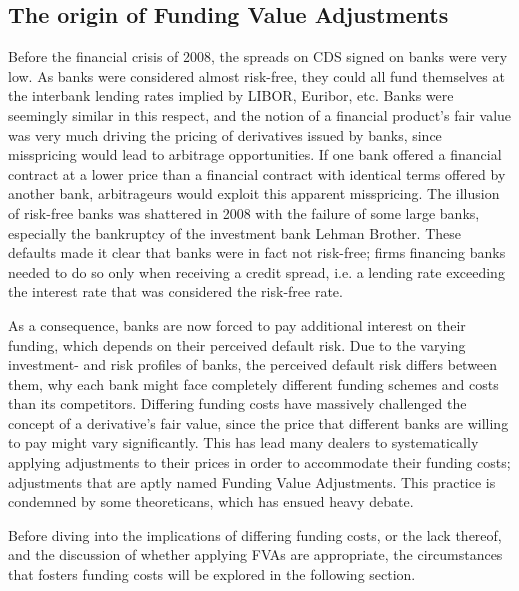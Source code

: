 \documentclass[../../../main.tex]{subfiles}
\begin{document}
    \subsection{The origin of Funding Value Adjustments}
        Before the financial crisis of 2008, the spreads on CDS signed on banks were very low. 
        As banks were considered almost risk-free, 
        they could all fund themselves at the interbank lending rates implied by LIBOR, Euribor, etc.
        Banks were seemingly similar in this respect, and the notion of a financial product's fair value was very much
        driving the pricing of derivatives issued by banks, since misspricing would lead to arbitrage opportunities.
        If one bank offered a financial contract at a lower price than a financial contract with identical terms
        offered by another bank, arbitrageurs would exploit this apparent misspricing. 
        The illusion of risk-free banks was shattered in 2008 with the failure of some large banks, 
        especially the bankruptcy of the investment bank Lehman Brother.
        These defaults made it clear that banks were in fact not risk-free; 
        firms financing banks needed to do so only when receiving a credit spread,
        i.e. a lending rate exceeding the interest rate that was considered the risk-free rate. 
        
        As a consequence, banks are now forced to pay additional interest on their funding, 
        which depends on their perceived default risk.
        Due to the varying investment- and risk profiles of banks, 
        the perceived default risk differs between them, 
        why each bank might face completely different funding schemes and costs than its competitors.
        Differing funding costs have massively challenged the concept of a derivative's fair value,
        since the price that different banks are willing to pay might vary significantly. 
        This has lead many dealers to systematically applying adjustments to their prices
        in order to accommodate their funding costs; 
        adjustments that are aptly named Funding Value Adjustments. 
        This practice is condemned by some theoreticans, 
        which has ensued heavy debate.
        
        Before diving into the implications of differing funding costs, or the lack thereof,
        and the discussion of whether applying FVAs are appropriate,
        the circumstances that fosters funding costs will be explored in the following section.
\end{document}
